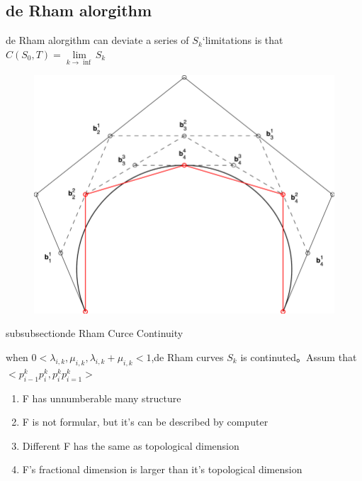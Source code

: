 \newpage


\subsection{de Rham alorgithm}
de Rham alorgithm can deviate a series of $S_k$‘limitations is that $C(S_0,T) = \lim\limits_{k\rightarrow \inf}S_k$


\begin{figure}
	\begin{center}
		\includegraphics[scale=1]{img/1.png}
	\end{center}
	\caption{}\label{fig:}
\end{figure}

subsubsection{de Rham Curce Continuity}

\begin{property}[Continuity]
	when $0<\lambda _{i,k},\mu_{i,k},\lambda_{i,k}+\mu_{i,k}<1$,de Rham curves $S_k$ is continuted。Assum that $<p_{i-1}^{k}p_{i}^{k},p_{i}^{k}p_{i=1}^{k}>$
\end{property}

\begin{property}
	\begin{enumerate}
		\item F has unnumberable many structure
		\item F is not formular, but it's can be described by computer
		\item Different F has the same as topological dimension
		\item F's fractional dimension is larger than it's topological dimension
	\end{enumerate}
\end{property}

